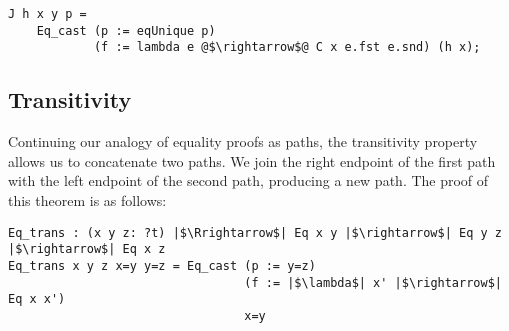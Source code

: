 \documentclass[12pt,twoside,maitrise]{dms}
\theoremstyle{definition}
\numberwithin{equation}{section}
\numberwithin{table}{chapter}
\numberwithin{figure}{chapter}
\begin{document}
\begin{verbatim}
J h x y p =
    Eq_cast (p := eqUnique p)
            (f := lambda e @$\rightarrow$@ C x e.fst e.snd) (h x);
\end{verbatim}

\subsection*{Transitivity}\label{subsection:eqtransitivity}
Continuing our analogy of equality proofs as paths, the transitivity property allows us to concatenate two paths. We join the right endpoint of the first path with the left endpoint of the second path, producing a new path. The proof of this theorem is as follows:

\begin{verbatim}
Eq_trans : (x y z: ?t) |$\Rrightarrow$| Eq x y |$\rightarrow$| Eq y z |$\rightarrow$| Eq x z
Eq_trans x y z x=y y=z = Eq_cast (p := y=z)
                                 (f := |$\lambda$| x' |$\rightarrow$| Eq x x')
                                 x=y
\end{verbatim}
\end{document}
